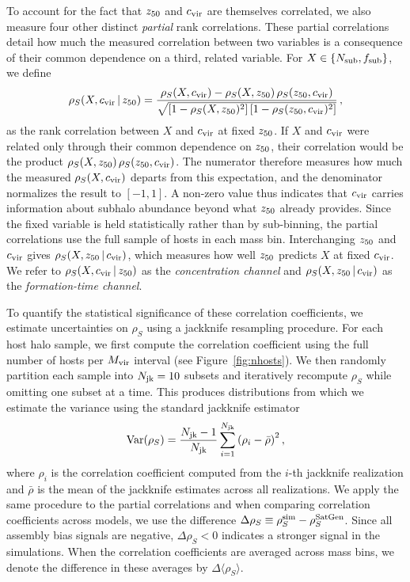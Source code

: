 \documentclass[twocolumn,apj,numberedappendix,twocolappendix,iop]{openjournal}
\begin{document}
To account for the fact that $z_{50}$ and $c_{\rm vir}$ are themselves correlated, we also measure four other distinct \textit{partial} rank correlations. These partial correlations detail how much the measured correlation between two variables is a consequence of their common dependence on a third, related variable. For $X \in \{N_{\rm sub}, f_{\rm sub}\}$, we define
%
\begin{equation}
\rho_S(X, c_{\rm vir} \,|\, z_{50}) = \frac{\rho_S(X, c_{\rm vir}) - \rho_S(X, z_{50})\,\rho_S(z_{50}, c_{\rm vir})}{\sqrt{\left[1-\rho_S(X, z_{50})^2\right]\left[1-\rho_S(z_{50}, c_{\rm vir})^2\right]}}\,,
\label{eq:partial}
\end{equation}
%
as the rank correlation between $X$ and $c_{\rm vir}$ at fixed $z_{50}$. If $X$ and $c_{\rm vir}$ were related only through their common dependence on $z_{50}$, their correlation would be the product $\rho_S(X, z_{50})\,\rho_S(z_{50}, c_{\rm vir})$. The numerator therefore measures how much the measured $\rho_S(X, c_{\rm vir})$ departs from this expectation, and the denominator normalizes the result to $[-1, 1]$. A non-zero value thus indicates that $c_{\rm vir}$ carries information about subhalo abundance beyond what $z_{50}$ already provides. Since the fixed variable is held statistically rather than by sub-binning, the partial correlations use the full sample of hosts in each mass bin. Interchanging $z_{50}$ and $c_{\rm vir}$ gives $\rho_S(X, z_{50} \,|\, c_{\rm vir})$, which measures how well $z_{50}$ predicts $X$ at fixed $c_{\rm vir}$. We refer to $\rho_S(X, c_{\rm vir} \,|\, z_{50})$ as the \textit{concentration channel} and $\rho_S(X, z_{50} \,|\, c_{\rm vir})$ as the \textit{formation-time channel}.

To quantify the statistical significance of these correlation coefficients, we estimate uncertainties on $\rho_S$ using a jackknife resampling procedure. For each host halo sample, we first compute the correlation coefficient using the full number of hosts per $M_{\rm vir}$ interval (see Figure~\ref{fig:nhosts}). We then randomly partition each sample into $N_{\rm jk} = 10$ subsets and iteratively recompute $\rho_S$ while omitting one subset at a time. This produces distributions from which we estimate the variance using the standard jackknife estimator
%
\begin{equation}
\mathrm{Var}(\rho_S) = \frac{N_{\rm jk}-1}{N_{\rm jk}} \sum_{i=1}^{N_{\rm jk}} \left( \rho_i - \bar{\rho} \right)^2,
\end{equation}
%
where $\rho_i$ is the correlation coefficient computed from the $i$-th jackknife realization and $\bar{\rho}$ is the mean of the jackknife estimates across all realizations. We apply the same procedure to the partial correlations and when comparing correlation coefficients across models, we use the difference $\Delta \rho_S \equiv \rho_S^{\rm sim} - \rho_S^{\rm SatGen}$. Since all assembly bias signals are negative, $\Delta \rho_S < 0$ indicates a stronger signal in the simulations. When the correlation coefficients are averaged across mass bins, we denote the difference in these averages by $\Delta \langle \rho_S \rangle$.
\end{document}
